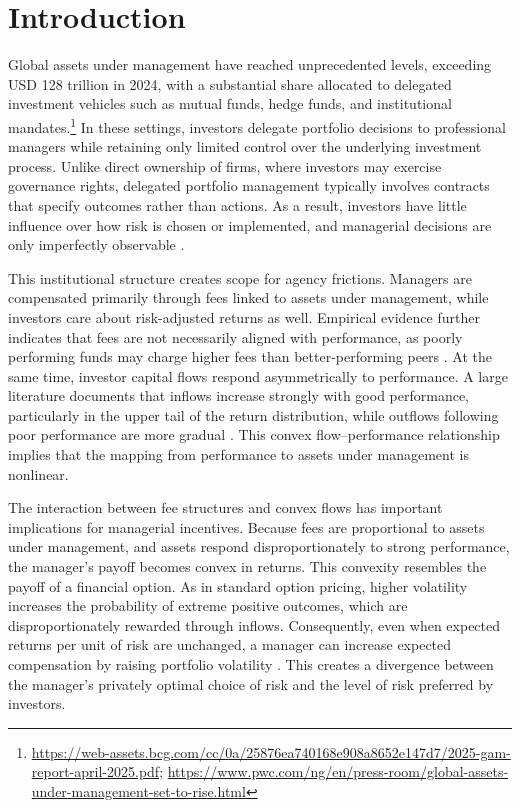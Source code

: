 \section{Introduction}
\label{sec:introduction}

Global assets under management have reached unprecedented levels, exceeding USD 128 trillion in 2024, with a substantial share allocated to delegated investment vehicles such as mutual funds, hedge funds, and institutional mandates.\footnote{\url{https://web-assets.bcg.com/cc/0a/25876ea740168e908a8652e147d7/2025-gam-report-april-2025.pdf}; \url{https://www.pwc.com/ng/en/press-room/global-assets-under-management-set-to-rise.html}} In these settings, investors delegate portfolio decisions to professional managers while retaining only limited control over the underlying investment process. Unlike direct ownership of firms, where investors may exercise governance rights, delegated portfolio management typically involves contracts that specify outcomes rather than actions. As a result, investors have little influence over how risk is chosen or implemented, and managerial decisions are only imperfectly observable \citep{BebchukCohenHirst2017}.

This institutional structure creates scope for agency frictions. Managers are compensated primarily through fees linked to assets under management, while investors care about risk-adjusted returns as well. Empirical evidence further indicates that fees are not necessarily aligned with performance, as poorly performing funds may charge higher fees than better-performing peers \citep{Gil-Bazo2008}. At the same time, investor capital flows respond asymmetrically to performance. A large literature documents that inflows increase strongly with good performance, particularly in the upper tail of the return distribution, while outflows following poor performance are more gradual \citep{Ippolito1992ConsumerReaction, chevalier1997risk, sirri1998costly}. This convex flow--performance relationship implies that the mapping from performance to assets under management is nonlinear.

The interaction between fee structures and convex flows has important implications for managerial incentives. Because fees are proportional to assets under management, and assets respond disproportionately to strong performance, the manager's payoff becomes convex in returns. This convexity resembles the payoff of a financial option. As in standard option pricing, higher volatility increases the probability of extreme positive outcomes, which are disproportionately rewarded through inflows. Consequently, even when expected returns per unit of risk are unchanged, a manager can increase expected compensation by raising portfolio volatility \citep{BrownHarlowStarks1996}. This creates a divergence between the manager's privately optimal choice of risk and the level of risk preferred by investors.

